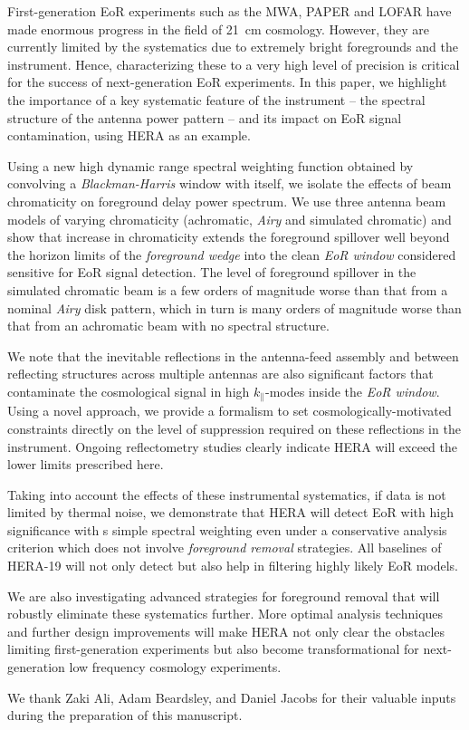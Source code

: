 \documentclass[preprint2,iop,numberedappendix,twocolappendix,appendixfloats]{emulateapj}
\begin{document}
First-generation EoR experiments such as the MWA, PAPER and LOFAR have made enormous progress in the field of 21~cm cosmology. However, they are currently limited by the systematics due to extremely bright foregrounds and the instrument. Hence, characterizing these to a very high level of precision is critical for the success of next-generation EoR experiments. In this paper, we highlight the importance of a key systematic feature of the instrument -- the spectral structure of the antenna power pattern -- and its impact on EoR signal contamination, using HERA as an example. 

Using a new high dynamic range spectral weighting function obtained by convolving a {\it Blackman-Harris} window with itself, we isolate the effects of beam chromaticity on foreground delay power spectrum. We use three antenna beam models of varying chromaticity (achromatic, {\it Airy} and simulated chromatic) and show that increase in chromaticity extends the foreground spillover well beyond the horizon limits of the {\it foreground wedge} into the clean {\it EoR window} considered sensitive for EoR signal detection. The level of foreground spillover in the simulated chromatic beam is a few orders of magnitude worse than that from a nominal {\it Airy} disk pattern, which in turn is many orders of magnitude worse than that from an achromatic beam with no spectral structure. 

We note that the inevitable reflections in the antenna-feed assembly and between reflecting structures across multiple antennas are also significant factors that contaminate the cosmological signal in high $k_\parallel$-modes inside the {\it EoR window}. Using a novel approach, we provide a formalism to set cosmologically-motivated constraints directly on the level of suppression required on these reflections in the instrument. Ongoing reflectometry studies clearly indicate HERA will exceed the lower limits prescribed here.

Taking into account the effects of these instrumental systematics, if data is not limited by thermal noise, we demonstrate that HERA will detect EoR with high significance with s simple spectral weighting even under a conservative analysis criterion which does not involve {\it foreground removal} strategies. All baselines of HERA-19 will not only detect but also help in filtering highly likely EoR models. 

We are also investigating advanced strategies for foreground removal that will robustly eliminate these systematics further. More optimal analysis techniques and further design improvements will make HERA not only clear the obstacles limiting first-generation experiments but also become transformational for next-generation low frequency cosmology experiments.

\acknowledgments

We thank Zaki Ali, Adam Beardsley, and Daniel Jacobs for their valuable inputs during the preparation of this manuscript.




\end{document}
